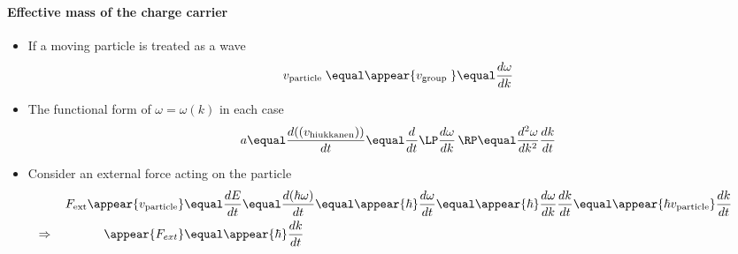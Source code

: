 \begin{frame}
\frametitle{\texorpdfstring{\culine[\sectiontitleulinecolor]{\sectiontitle}}{\sectiontitle} }
\framesubtitle{Effective mass of the charge carrier}

\seminormal
\begin{itemize}
	\item If a moving particle is treated as a wave\vspace{-4mm}
\[
v_{\text {particle }}  \equal \appear{v_{\text {group }}}  \equal \frac{d \omega}{d k}
\]
\item The functional form of $\omega=\omega(k)$ in each case 
\[
a  \equal \frac{d \textrm{((}v_{\text {hiukkanen}} \textrm{))}}{d t}  \equal \frac{d}{d t} \LP \frac{d \omega}{d k} \,\RP  \equal \frac{d^{2} \omega}{d k^{2}} \frac{d k}{d t}
\]

\item Consider an external force acting on the particle
$$
\begin{aligned}
F_{\text {ext}} \appear{v_{\text {particle}}} & \equal \frac{d E}{d t}  \equal \frac{d(\hbar \omega)}{d t}  \equal \appear{\hbar} \frac{d \omega}{d t} \equal \appear{\hbar} \frac{d \omega}{d k} \frac{d k}{d t}  \equal \appear{\hbar v_{\text {particle}}} \frac{d k}{d t} \qquad \\
\Rightarrow \qquad \qquad \appear{F_{ext}}&  \equal \appear{\hbar} \frac{d k}{d t}
\end{aligned}
$$
\end{itemize}

\endofslide 
\end{frame}

